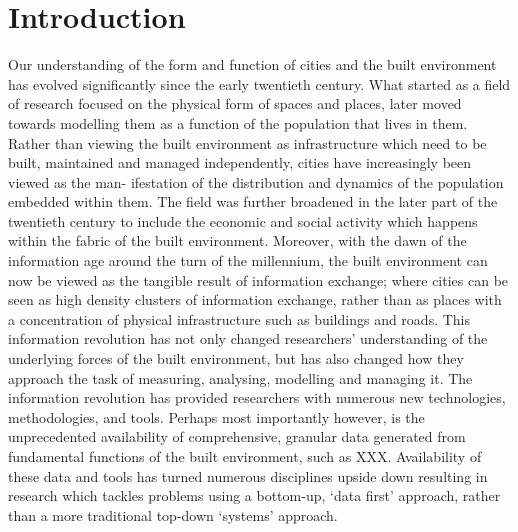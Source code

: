 \chapter{Introduction}

Our understanding of the form and function of cities and the built environment has evolved significantly since the early twentieth century.
What started as a field of research focused on the physical form of spaces and places, later moved towards modelling them as a function of the population that lives in them.
Rather than viewing the built environment as infrastructure which need to be built, maintained and managed independently, cities have increasingly been viewed as the man- ifestation of the distribution and dynamics of the population embedded within them.
The field was further broadened in the later part of the twentieth century to include the economic and social activity which happens within the fabric of the built environment.
Moreover, with the dawn of the information age around the turn of the millennium, the built environment can now be viewed as the tangible result of information exchange; where cities can be seen as high density clusters of information exchange, rather than as places with a concentration of physical infrastructure such as buildings and roads.
This information revolution has not only changed researchers' understanding of the underlying forces of the built environment, but has also changed how they approach the task of measuring, analysing, modelling and managing it.
The information revolution has provided researchers with numerous new technologies, methodologies, and tools.
Perhaps most importantly however, is the unprecedented availability of comprehensive, granular data generated from fundamental functions of the built environment, such as XXX.
Availability of these data and tools has turned numerous disciplines upside down resulting in research which tackles problems using a bottom-up, `data first' approach, rather than a more traditional top-down `systems' approach. 

